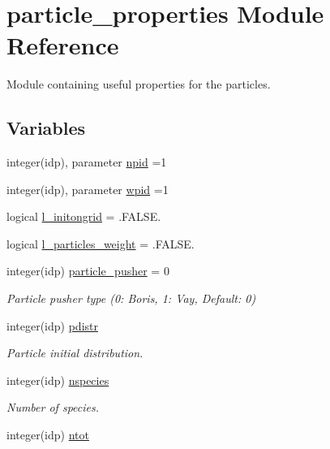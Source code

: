 \hypertarget{namespaceparticle__properties}{}\section{particle\+\_\+properties Module Reference}
\label{namespaceparticle__properties}


Module containing useful properties for the particles.  


\subsection*{Variables}
\begin{DoxyCompactItemize}
\item 
integer(idp), parameter \hyperlink{namespaceparticle__properties_a9a2b5f322610353c06693336b21439f7}{npid} =1
\item 
integer(idp), parameter \hyperlink{namespaceparticle__properties_a9661ac258a1ee308b3cad93e5da3c579}{wpid} =1
\item 
logical \hyperlink{namespaceparticle__properties_ac2f3b846a4154ff9b4cccadaffe4bfa9}{l\+\_\+initongrid} = .F\+A\+L\+S\+E.
\item 
logical \hyperlink{namespaceparticle__properties_a886a9f7d338c6c8fc14d80df9ac732ae}{l\+\_\+particles\+\_\+weight} = .F\+A\+L\+S\+E.
\item 
integer(idp) \hyperlink{namespaceparticle__properties_ab885434a8bf6905c7fbd9108e77175f4}{particle\+\_\+pusher} = 0
\begin{DoxyCompactList}\small\item\em Particle pusher type (0\+: Boris, 1\+: Vay, Default\+: 0) \end{DoxyCompactList}\item 
integer(idp) \hyperlink{namespaceparticle__properties_aaf6c9fb8697f29ccff6e1d82ee7f477a}{pdistr}
\begin{DoxyCompactList}\small\item\em Particle initial distribution. \end{DoxyCompactList}\item 
integer(idp) \hyperlink{namespaceparticle__properties_a5aabee3c3d0e9e902989125d50e03426}{nspecies}
\begin{DoxyCompactList}\small\item\em Number of species. \end{DoxyCompactList}\item 
integer(idp) \hyperlink{namespaceparticle__properties_a9fa6e3ec64928bf64db8c78d73f97389}{ntot}

\end{DoxyCompactItemize}
